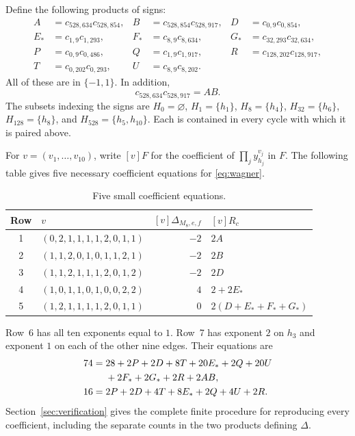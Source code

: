 \documentclass[11pt,a4paper]{article}
\begin{document}
Define the following products of signs:
\begin{equation}\label{eq:products}
\begin{aligned}
 A&=c_{528,634}c_{528,854},&
 B&=c_{528,854}c_{528,917},&
 D&=c_{0,9}c_{0,854},\\
 E_*&=c_{1,9}c_{1,293},&
 F_*&=c_{8,9}c_{8,634},&
 G_*&=c_{32,293}c_{32,634},\\
 P&=c_{0,9}c_{0,486},&
 Q&=c_{1,9}c_{1,917},&
 R&=c_{128,202}c_{128,917},\\
 T&=c_{0,202}c_{0,293},&
 U&=c_{8,9}c_{8,202}.&&
\end{aligned}
\end{equation}
All of these are in $\{-1,1\}$. In addition,
\begin{equation}\label{eq:AB}
 c_{528,634}c_{528,917}=AB.
\end{equation}
The subsets indexing the signs are $H_0=\varnothing$, $H_1=\{h_1\}$,
$H_8=\{h_4\}$, $H_{32}=\{h_6\}$, $H_{128}=\{h_8\}$,
and $H_{528}=\{h_5,h_{10}\}$. Each is contained in every cycle
with which it is paired above.

For $v=(v_1,\ldots,v_{10})$, write $[v]F$ for the coefficient of
$\prod_j y_{h_j}^{v_j}$ in $F$. The following table gives five
necessary coefficient equations for \eqref{eq:wagner}.

\begin{table}[ht]
\centering\small
\begin{tabular}{clrl}
\toprule
Row & $v$ & $[v]\Delta_{M_8,e,f}$ & $[v]R_c$\\
\midrule
1 & $(0,2,1,1,1,1,2,0,1,1)$ & $-2$ & $2A$\\
2 & $(1,1,2,0,1,0,1,1,2,1)$ & $-2$ & $2B$\\
3 & $(1,1,2,1,1,1,2,0,1,2)$ & $-2$ & $2D$\\
4 & $(1,0,1,1,0,1,0,0,2,2)$ & $4$ & $2+2E_*$\\
5 & $(1,2,1,1,1,1,2,0,1,1)$ & $0$ & $2(D+E_*+F_*+G_*)$\\
\bottomrule
\end{tabular}
\caption{Five small coefficient equations.}\label{tab:small}
\end{table}

Row~6 has all ten exponents equal to $1$. Row~7 has exponent $2$
on $h_3$ and exponent $1$ on each of the other nine edges.
Their equations are
\begin{align}
74={}&28+2P+2D+8T+20E_*+2Q+20U\notag\\
     &{}+2F_*+2G_*+2R+2AB,\label{eq:row6}\\
16={}&2P+2D+4T+8E_*+2Q+4U+2R.\label{eq:row7}
\end{align}
Section~\ref{sec:verification} gives the complete finite procedure
for reproducing every coefficient, including the separate counts
in the two products defining $\Delta$.
\end{document}
